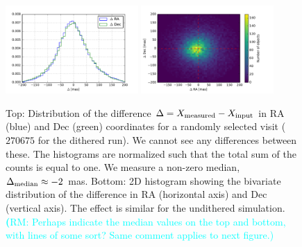 \documentclass[twocolumn]{aastex62}
\newcommand{\rachel}[1]{{\textcolor{cyan}{{\textbf (RM: #1)}}}}
\begin{document}
\begin{figure}
  \centering
  \includegraphics[width=0.45\textwidth]{astrometry_single_visit_imsim_dithered_hist}
  \includegraphics[width=0.45\textwidth]{astrometry_single_visit_imsim_dithered_hist2d}
  \caption{Top: Distribution of the difference $\Delta=X_{\rm measured}-X_{\rm input}$ in RA (blue) and Dec
    (green) coordinates for a randomly selected visit ($270675$ for the dithered run). We cannot see
    any differences between these. The histograms are normalized such that the total sum of the
    counts is equal to one. We measure a non-zero median, $\Delta_{\rm median} \approx -2$ mas. Bottom:
    2D histogram showing the bivariate distribution of the difference in RA (horizontal axis) and
    Dec (vertical axis). The effect is similar for the undithered simulation. \rachel{Perhaps indicate the median values on the top and bottom, with lines of some sort?  Same comment applies to next figure.}}
  \label{fig:astrometry_a}
\end{figure}
\end{document}
